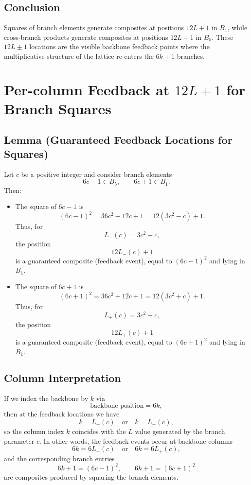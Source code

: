 \documentclass[12pt]{article}
\begin{document}
\subsection*{Conclusion}
Squares of branch elements generate composites at positions $12L+1$ in $B_1$,
while cross-branch products generate composites at positions $12L-1$ in $B_5$.
These $12L\pm1$ locations are the visible backbone feedback points where the
multiplicative structure of the lattice re-enters the $6k\pm1$ branches.

\section{Per-column Feedback at $12L+1$ for Branch Squares}

\subsection*{Lemma (Guaranteed Feedback Locations for Squares)}
Let $c$ be a positive integer and consider branch elements
\[
6c-1 \in B_5, \qquad 6c+1 \in B_1.
\]
Then:

\begin{itemize}
\item[(1)] The square of $6c-1$ is
\[
(6c-1)^2 = 36c^2 - 12c + 1 = 12(3c^2 - c) + 1.
\]
Thus, for
\[
L_-(c) = 3c^2 - c,
\]
the position
\[
12L_-(c) + 1
\]
is a guaranteed composite (feedback event), equal to $(6c-1)^2$ and lying in $B_1$.

\item[(2)] The square of $6c+1$ is
\[
(6c+1)^2 = 36c^2 + 12c + 1 = 12(3c^2 + c) + 1.
\]
Thus, for
\[
L_+(c) = 3c^2 + c,
\]
the position
\[
12L_+(c) + 1
\]
is a guaranteed composite (feedback event), equal to $(6c+1)^2$ and lying in $B_1$.
\end{itemize}

\subsection*{Column Interpretation}
If we index the backbone by $k$ via
\[
\text{backbone position} = 6k,
\]
then at the feedback locations we have
\[
k = L_-(c) \quad \text{or} \quad k = L_+(c),
\]
so the column index $k$ coincides with the $L$ value generated by the branch
parameter $c$. In other words, the feedback events occur at backbone columns
\[
6k = 6L_-(c) \quad \text{or} \quad 6k = 6L_+(c),
\]
and the corresponding branch entries
\[
6k+1 = (6c-1)^2, \qquad 6k+1 = (6c+1)^2
\]
are composites produced by squaring the branch elements.
\end{document}
